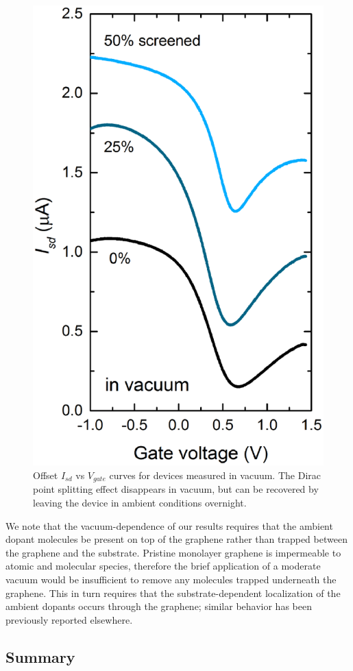 \documentclass[edeposit,fullpage,draftthesis]{uiucthesis2009}
\begin{document}
        \begin{figure}
          \centering
          \includegraphics[width=.50\textwidth]{images/resultsanddiscussion/pztpaper/figure4}
          \caption[I-V curves for graphene-ferroelectric pn junction devices measured in vacuum]{
           Offset $I_{sd}$ vs $V_{gate}$ curves for devices measured in vacuum. The Dirac point splitting effect disappears in vacuum, but can be recovered by leaving the device in ambient conditions overnight.
          }
          \label{fig:PZTvacuum}
        \end{figure}

        We note that the vacuum-dependence of our results requires that the ambient dopant molecules be present on top of the graphene rather than trapped between the graphene and the substrate. Pristine monolayer graphene is impermeable to atomic and molecular species\cite{Bunch2008}, therefore the brief application of a moderate vacuum would be insufficient to remove any molecules trapped underneath the graphene. This in turn requires that the substrate-dependent localization of the ambient dopants occurs through the graphene; similar behavior has been previously reported elsewhere\cite{Moser2007, Moser2008, Lohmann2009, Lafkioti2010}.


    \subsection{Summary}
\end{document}
